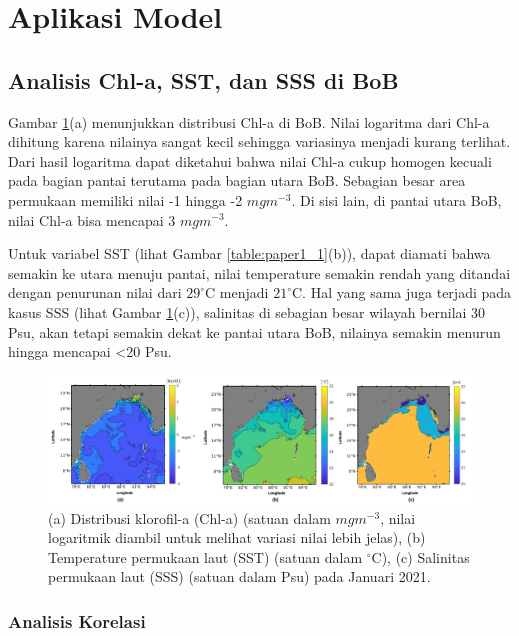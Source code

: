 \section[Aplikasi Model]{Aplikasi Model}
\begin{spacing}{1.5}
	\vspace{-1pc}
\subsection[Analisis Chl-a, SST, dan SSS di BoB]{Analisis Chl-a, SST, dan SSS di BoB}
	Gambar \ref{fig:paper1_1}(a) menunjukkan distribusi Chl-a di BoB. Nilai logaritma dari Chl-a dihitung karena nilainya sangat kecil sehingga variasinya menjadi kurang terlihat. Dari hasil logaritma dapat diketahui bahwa nilai Chl-a cukup homogen kecuali pada bagian pantai terutama pada bagian utara BoB. Sebagian besar area permukaan memiliki nilai -1 hingga -2 $mgm^{-3}$. Di sisi lain, di pantai utara BoB, nilai Chl-a bisa mencapai 3 $mgm^{-3}$.
	
	Untuk variabel SST (lihat Gambar \ref{table:paper1_1}(b)), dapat diamati bahwa semakin ke utara menuju pantai, nilai temperature semakin rendah yang ditandai dengan penurunan nilai dari $29^\circ$C menjadi $21^\circ$C. Hal yang sama juga terjadi pada kasus SSS (lihat Gambar \ref{fig:paper1_1}(c)), salinitas di sebagian besar wilayah bernilai 30 Psu, akan tetapi semakin dekat ke pantai utara BoB, nilainya semakin menurun hingga mencapai <20 Psu.
	
	\begin{figure}[H]
		\centering
		\includegraphics[width=15cm]{contents/final_figure_paper1/gambar_1}
		\caption{(a) Distribusi klorofil-a (Chl-a) (satuan dalam $mgm^{-3}$, nilai logaritmik diambil untuk melihat variasi nilai lebih jelas), (b) Temperature permukaan laut (SST) (satuan dalam $^\circ$C), (c) Salinitas permukaan laut (SSS) (satuan dalam Psu) pada Januari 2021.}
		\label{fig:paper1_1}
	\end{figure}
\subsubsection[Analisis Korelasi]{Analisis Korelasi}
	

\end{spacing}
